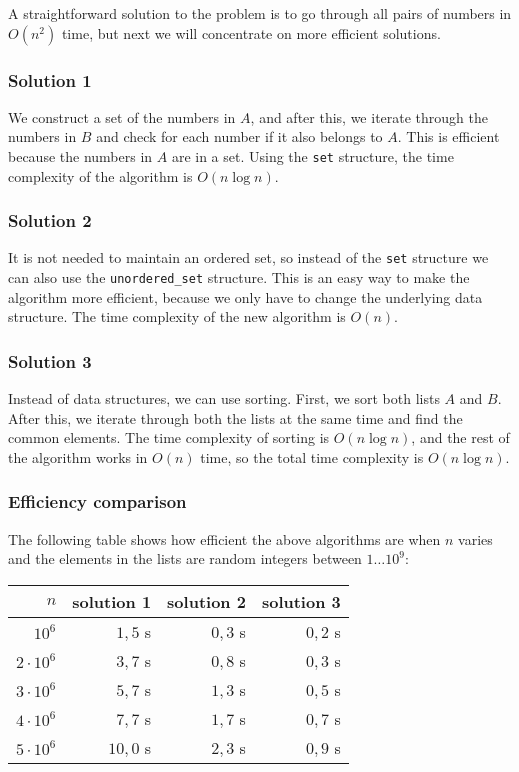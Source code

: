 A straightforward solution to the problem is
to go through all pairs of numbers in $O(n^2)$ time,
but next we will concentrate on
more efficient solutions.

\subsubsection{Solution 1}

We construct a set of the numbers in $A$,
and after this, we iterate through the numbers
in $B$ and check for each number if it
also belongs to $A$.
This is efficient because the numbers in $A$
are in a set.
Using the \texttt{set} structure,
the time complexity of the algorithm is $O(n \log n)$.

\subsubsection{Solution 2}

It is not needed to maintain an ordered set,
so instead of the \texttt{set} structure
we can also use the \texttt{unordered\_set} structure.
This is an easy way to make the algorithm
more efficient, because we only have to change
the underlying data structure.
The time complexity of the new algorithm is $O(n)$.

\subsubsection{Solution 3}

Instead of data structures, we can use sorting.
First, we sort both lists $A$ and $B$.
After this, we iterate through both the lists
at the same time and find the common elements.
The time complexity of sorting is $O(n \log n)$,
and the rest of the algorithm works in $O(n)$ time,
so the total time complexity is $O(n \log n)$.

\subsubsection{Efficiency comparison}

The following table shows how efficient
the above algorithms are when $n$ varies and
the elements in the lists are random
integers between $1 \ldots 10^9$:

\begin{center}
\begin{tabular}{rrrr}
$n$ & solution 1 & solution 2 & solution 3 \\
\hline
$10^6$ & $1{,}5$ s & $0{,}3$ s & $0{,}2$ s \\
$2 \cdot 10^6$ & $3{,}7$ s & $0{,}8$ s & $0{,}3$ s \\
$3 \cdot 10^6$ & $5{,}7$ s & $1{,}3$ s & $0{,}5$ s \\
$4 \cdot 10^6$ & $7{,}7$ s & $1{,}7$ s & $0{,}7$ s \\
$5 \cdot 10^6$ & $10{,}0$ s & $2{,}3$ s & $0{,}9$ s \\
\end{tabular}
\end{center}

